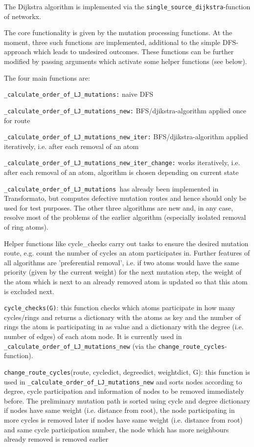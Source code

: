 The Dijkstra algorithm is implemented via the \texttt{single\_source\_dijkstra}-function
of networkx.

The core functionality is given by the mutation processing functions.
At the moment, three such functions are implemented, additional to
the simple DFS-approach which leads to undesired outcomes. These functions
can be further modified by passing arguments which activate some helper
functions (see below).

The four main functions are: 

\texttt{\_calculate\_order\_of\_LJ\_mutations:} naive DFS 

\texttt{\_calculate\_order\_of\_LJ\_mutations\_new:} BFS/djikstra-algorithm
applied once for route

\texttt{\_calculate\_order\_of\_LJ\_mutations\_new\_iter:} BFS/djikstra-algorithm
applied iteratively, i.e. after each removal of an atom 

\texttt{\_calculate\_order\_of\_LJ\_mutations\_new\_iter\_change:}
works iteratively, i.e. after each removal of an atom, algorithm is
chosen depending on current state

\texttt{\_calculate\_order\_of\_LJ\_mutations }has already been implemented
in Transformato, but computes defective mutation routes and hence
should only be used for test purposes. The other three algorithms
are new and, in any case, resolve most of the problems of the earlier
algorithm (especially isolated removal of ring atoms).

Helper functions like cycle\_checks carry out tasks to ensure the
desired mutation route, e.g. count the number of cycles an atom participates
in. Further features of all algorithms are 'preferential removal',
i.e. if two atoms would have the same priority (given by the current
weight) for the next mutation step, the weight of the atom which is
next to an already removed atom is updated so that this atom is excluded
next.

\texttt{cycle\_checks(G)}: this function checks which atoms participate
in how many cycles/rings and returns a dictionary with the atoms as
key and the number of rings the atom is participating in as value
and a dictionary with the degree (i.e. number of edges) of each atom
node. It is currently used in \texttt{\_calculate\_order\_of\_LJ\_mutations\_new}
(via the \texttt{change\_route\_cycles}-function).

\texttt{change\_route\_cycles}(route, cycledict, degreedict, weightdict,
G): this function is used in \texttt{\_calculate\_order\_of\_LJ\_mutations\_new}
and sorts nodes according to degree, cycle participation and information
of nodes to be removed immediately before. The preliminary mutation
path is sorted using cycle and degree dictionary if nodes have same
weight (i.e. distance from root), the node participating in more cycles
is removed later if nodes have same weight (i.e. distance from root)
and same cycle participation number, the node which has more neighbours
already removed is removed earlier

